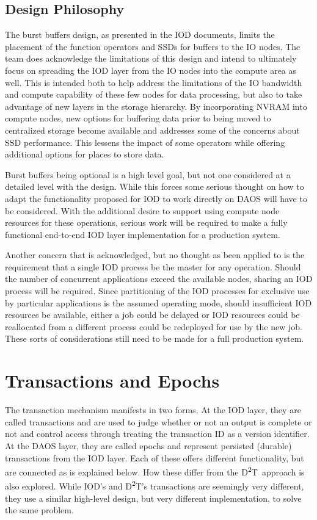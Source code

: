 \documentclass[conference]{IEEEtran}
\newcommand{\DDT}{D\textsuperscript{2}T~}
\newcommand{\DDTns}{D\textsuperscript{2}T}
\begin{document}
\subsection{Design Philosophy}
The burst buffers design, as presented in the IOD documents, limits the
placement of the function operators and SSDs for buffers to the IO nodes. The
team does acknowledge the limitations of this design and intend to ultimately
focus on spreading the IOD layer from the IO nodes into the compute area as
well.  This is intended both to help address the limitations of the IO
bandwidth and compute capability of these few nodes for data processing, but
also to take advantage of new layers in the storage hierarchy. By incorporating
NVRAM into compute nodes, new options for buffering data prior to being moved
to centralized storage become available and addresses some of the concerns
about SSD performance. This lessens the impact of some operators while offering
additional options for places to store data.

Burst buffers being optional is a high level goal, but not one considered at a
detailed level with the design. While this forces some serious thought on how
to adapt the functionality proposed for IOD to work directly on DAOS will have
to be considered. With the additional desire to support using compute node
resources for these operations, serious work will be required to make a fully
functional end-to-end IOD layer implementation for a production system.

Another concern that is acknowledged, but no thought as been applied to is the
requirement that a single IOD process be the master for any operation. Should
the number of concurrent applications exceed the available nodes, sharing an
IOD process will be required. Since partitioning of the IOD processes for
exclusive use by particular applications is the assumed operating mode, should
insufficient IOD resources be available, either a job could be delayed or IOD
resources could be reallocated from a different process could be redeployed for
use by the new job. These sorts of considerations still need to be made for a
full production system.

\section{Transactions and Epochs}
\label{sec:transactions}

The transaction mechanism manifests in two forms. At the IOD layer, they are
called transactions and are used to judge whether or not an output is complete
or not and control access through treating the transaction ID as a version
identifier. At the DAOS layer, they are called epochs and represent persisted
(durable) transactions from the IOD layer. Each of these offers different
functionality, but are connected as is explained below. How these differ from
the \DDT approach is also explored. While IOD's and \DDTns's transactions are
seemingly very different, they use a similar high-level design, but very
different implementation, to solve the same problem.
\end{document}
